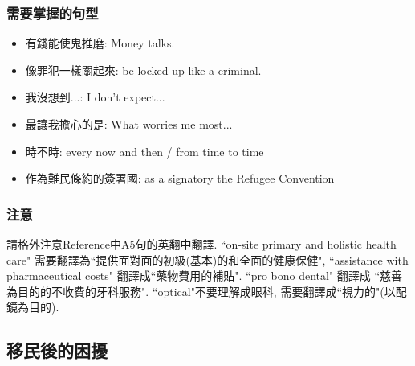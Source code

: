 \subsubsection*{需要掌握的句型}
\begin{itemize}
  \itemsep0em
  \item 有錢能使鬼推磨: Money talks.
  \item 像罪犯一樣關起來: be locked up like a criminal.
  \item 我沒想到...: I don't expect...
  \item 最讓我擔心的是: What worries me most...
  \item 時不時: every now and then / from time to time
  \item 作為難民條約的簽署國: as a signatory  the Refugee Convention
\end{itemize}

\subsubsection*{注意}
請格外注意Reference中A5句的英翻中翻譯. ``on-site primary and holistic health care" 需要翻譯為``提供面對面的初級(基本)的和全面的健康保健", ``assistance with pharmaceutical costs" 翻譯成``藥物費用的補貼". ``pro bono dental" 翻譯成 ``慈善為目的的不收費的牙科服務". ``optical"不要理解成眼科, 需要翻譯成``視力的"(以配鏡為目的).

\subsection{移民後的困擾}
